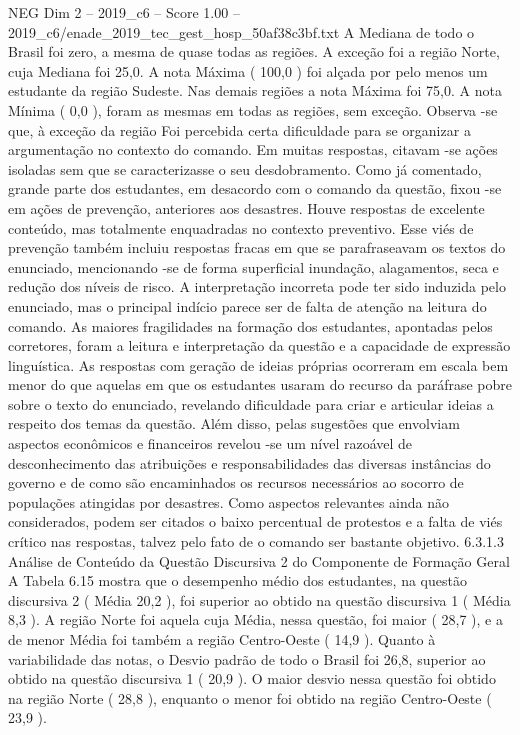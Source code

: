 \begin{textsample}{NEG Dim 2 – 2019\_c6 – Score 1.00 – 2019\_c6/enade\_2019\_tec\_gest\_hosp\_50af38c3bf.txt}
A Mediana de todo o Brasil foi zero, a mesma de quase todas as regiões.
A exceção foi a região Norte, cuja Mediana foi 25,0.
A nota Máxima ( 100,0 ) foi alçada por pelo menos um estudante da região Sudeste.
Nas demais regiões a nota Máxima foi 75,0.
A nota Mínima ( 0,0 ), foram as mesmas em todas as regiões, sem exceção.
Observa -se que, à exceção da região Foi percebida certa dificuldade para se organizar a argumentação no contexto do comando.
Em muitas respostas, citavam -se ações isoladas sem que se caracterizasse o seu desdobramento.
Como já comentado, grande parte dos estudantes, em desacordo com o comando da questão, fixou -se em ações de prevenção, anteriores aos desastres.
Houve respostas de excelente conteúdo, mas totalmente enquadradas no contexto preventivo.
Esse viés de prevenção também incluiu respostas fracas em que se parafraseavam os textos do enunciado, mencionando -se de forma superficial inundação, alagamentos, seca e redução dos níveis de risco.
A interpretação incorreta pode ter sido induzida pelo enunciado, mas o principal indício parece ser de falta de atenção na leitura do comando.
As maiores fragilidades na formação dos estudantes, apontadas pelos corretores, foram a leitura e interpretação da questão e a capacidade de expressão linguística.
As respostas com geração de ideias próprias ocorreram em escala bem menor do que aquelas em que os estudantes usaram do recurso da paráfrase pobre sobre o texto do enunciado, revelando dificuldade para criar e articular ideias a respeito dos temas da questão.
Além disso, pelas sugestões que envolviam aspectos econômicos e financeiros revelou -se um nível razoável de desconhecimento das atribuições e responsabilidades das diversas instâncias do governo e de como são encaminhados os recursos necessários ao socorro de populações atingidas por desastres.
Como aspectos relevantes ainda não considerados, podem ser citados o baixo percentual de protestos e a falta de viés crítico nas respostas, talvez pelo fato de o comando ser bastante objetivo. 6.3.1.3 Análise de Conteúdo da Questão Discursiva 2 do Componente de Formação Geral A Tabela 6.15 mostra que o desempenho médio dos estudantes, na questão discursiva 2 ( Média 20,2 ), foi superior ao obtido na questão discursiva 1 ( Média 8,3 ).
A região Norte foi aquela cuja Média, nessa questão, foi maior ( 28,7 ), e a de menor Média foi também a região Centro-Oeste ( 14,9 ).
Quanto à variabilidade das notas, o Desvio padrão de todo o Brasil foi 26,8, superior ao obtido na questão discursiva 1 ( 20,9 ).
O maior desvio nessa questão foi obtido na região Norte ( 28,8 ), enquanto o menor foi obtido na região Centro-Oeste ( 23,9 ).

\end{textsample}
